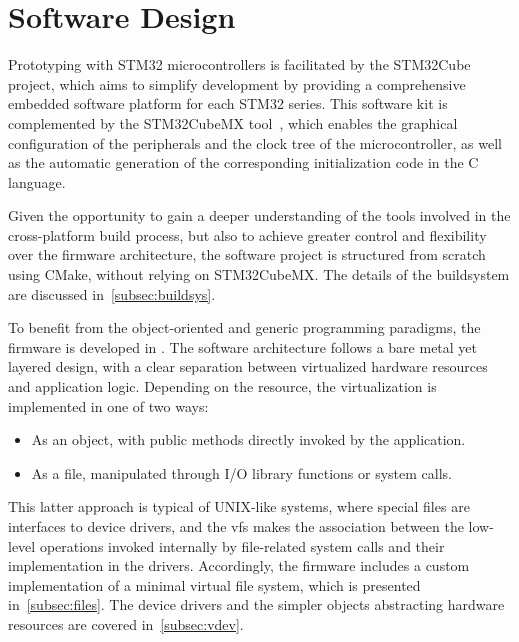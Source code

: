 \section{Software Design}\label{sec:sw_design}

Prototyping with STM32 microcontrollers is facilitated by the STM32Cube project, which aims to simplify development by providing a comprehensive embedded software platform for each STM32 series. This software kit is complemented by the STM32CubeMX tool~\cite{cubemx}, which enables the graphical configuration of the peripherals and the clock tree of the microcontroller, as well as the automatic generation of the corresponding initialization code in the C language.

Given the opportunity to gain a deeper understanding of the tools involved in the cross-platform build process, but also to achieve greater control and flexibility over the firmware architecture, the software project is structured from scratch using CMake, without relying on STM32CubeMX. The details of the buildsystem are discussed in~\cref{subsec:buildsys}.

To benefit from the object-oriented and generic programming paradigms, the firmware is developed in \cpp. The software architecture follows a bare metal yet layered design, with a clear separation between virtualized hardware resources and application logic. Depending on the resource, the virtualization is implemented in one of two ways:
\begin{itemize}
    \item As an object, with public methods directly invoked by the application. 
    \item As a file, manipulated through I/O library functions or system calls.  
\end{itemize}
This latter approach is typical of UNIX-like systems, where special files are interfaces to device drivers, and the \ac{vfs} makes the association between the low-level operations invoked internally by file-related system calls and their implementation in the drivers. Accordingly, the firmware includes a custom implementation of a minimal virtual file system, which is presented in~\cref{subsec:files}. The device drivers and the simpler objects abstracting hardware resources are covered in~\cref{subsec:vdev}.

